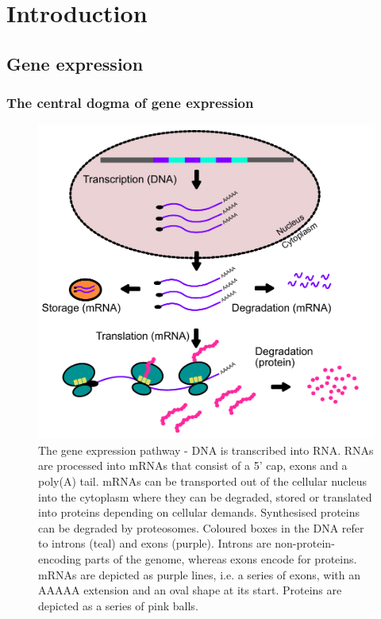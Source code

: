 \documentclass[12pt,openany]{book}
\begin{document}
\clearpage
{} \setcounter{page}{1}

\chapter{Introduction}\section{Gene expression}\subsection{The central dogma of gene expression}

\begin{figure}
  \includegraphics{./figures/geneExprPath_2.pdf}
  \caption{The gene expression pathway - DNA is transcribed into RNA. RNAs are processed into mRNAs that consist of a 5' cap, exons and a poly(A) tail. mRNAs can be transported out of the cellular nucleus into the cytoplasm where they can be degraded, stored or translated into proteins depending on cellular demands. Synthesised proteins can be degraded by proteosomes. Coloured boxes in the DNA refer to introns (teal) and exons (purple). Introns are non-protein-encoding parts of the genome, whereas exons encode for proteins. mRNAs are depicted as purple lines, i.e. a series of exons, with an AAAAA extension and an oval shape at its start. Proteins are depicted as a series of pink balls.  \label{fig:geneExprPath}}
\end{figure}
\end{document}
